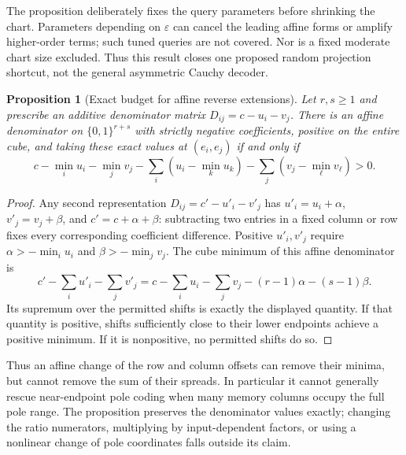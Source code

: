 \documentclass[11pt]{article}
\newtheorem{proposition}{Proposition}
\begin{document}
The proposition deliberately fixes the query parameters before
shrinking the chart. Parameters depending on $\varepsilon$ can
cancel the leading affine forms or amplify higher-order terms;
such tuned queries are not covered. Nor is a fixed moderate chart
size excluded. Thus this result closes one proposed random
projection shortcut, not the general asymmetric Cauchy decoder.

\begin{proposition}[Exact budget for affine reverse extensions]
\label{prop:reverse-gauge}
Let $r,s\ge1$ and prescribe an additive denominator matrix
$D_{ij}=c-u_i-v_j$. There is an affine denominator on
$\{0,1\}^{r+s}$ with strictly negative coefficients, positive on
the entire cube, and taking these exact values at $(e_i,e_j)$ if
and only if
\[
 c-\min_i u_i-\min_j v_j
   -\sum_i(u_i-\min_k u_k)
   -\sum_j(v_j-\min_\ell v_\ell)>0.
\]
\end{proposition}
\begin{proof}
Any second representation $D_{ij}=c'-u'_i-v'_j$ has
$u'_i=u_i+\alpha$, $v'_j=v_j+\beta$, and
$c'=c+\alpha+\beta$: subtracting two entries in a fixed column
or row fixes every corresponding coefficient difference.
Positive $u'_i,v'_j$ require
$\alpha>-\min_i u_i$ and $\beta>-\min_j v_j$.
The cube minimum of this affine denominator is
\[
 c'-\sum_i u'_i-\sum_jv'_j
 =c-\sum_i u_i-\sum_jv_j-(r-1)\alpha-(s-1)\beta.
\]
Its supremum over the permitted shifts is exactly the displayed
quantity. If that quantity is positive, shifts sufficiently close
to their lower endpoints achieve a positive minimum. If it is
nonpositive, no permitted shifts do so.
\end{proof}

Thus an affine change of the row and column offsets can remove
their minima, but cannot remove the sum of their spreads. In
particular it cannot generally rescue near-endpoint pole coding
when many memory columns occupy the full pole range. The
proposition preserves the denominator values exactly; changing the
ratio numerators, multiplying by input-dependent factors, or using
a nonlinear change of pole coordinates falls outside its claim.
\end{document}
